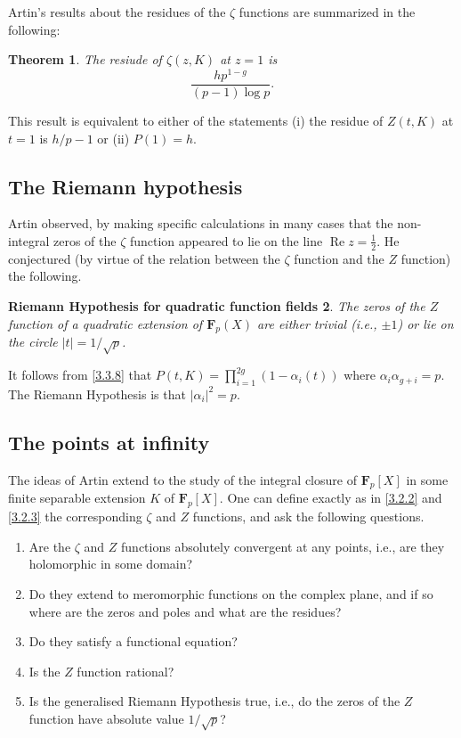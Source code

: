 \documentclass[10pt,leqno]{article}
\newtheorem{theo}{Theorem}[subsection]
\newtheorem{rhqff}[theo]{Riemann Hypothesis for quadratic function fields}
\theoremstyle{definition}
\def\FF{\mathbf{F}}
\DeclareMathOperator{\re}{Re}
\begin{document}
Artin's results about the residues of the $\zeta$ functions are summarized in the following:

\begin{theo}
\label{3.3.9}
The resiude of $\zeta(z,K)$ at $z = 1$ is
\[
\frac{hp^{1-g}}{(p-1)\log p}.
\]
\end{theo}


This result is equivalent to either of the statements (i) the residue of $Z(t,K)$ at $t=1$ is $h/p-1$ or (ii) $P(1) = h$.


\subsection{The Riemann hypothesis}
\label{ch:3.4}

Artin observed, by making specific calculations in many cases that the non-integral zeros of the $\zeta$ function appeared to lie on the line $\re z = \frac12$.
He conjectured (by virtue of the relation between the $\zeta$ function and the $Z$ function) the following.


\begin{rhqff}
\label{3.4.1}
The zeros of the $Z$ function of a quadratic extension of $\FF_p(X)$ are either trivial (i.e., $\pm1$) or lie on the circle $|t| = 1/\sqrt p$.
\end{rhqff}

It follows from \eqref{3.3.8} that $P(t,K) = \prod_{i=1}^{2g} (1-\alpha_i(t))$ where $\alpha_i \alpha_{g+i} = p$.
The Riemann Hypothesis is that $|\alpha_i|^2 = p$.


\subsection{The points at infinity}
\label{ch:3.5}

The ideas of Artin extend to the study of the integral closure of $\FF_p[X]$ in some finite separable extension $K$ of $\FF_p[X]$.
One can define exactly as in \eqref{3.2.2} and \eqref{3.2.3} the corresponding $\zeta$ and $Z$ functions, and ask the following questions.

\begin{enumerate}
\item
\label{3.5.1}
Are the $\zeta$ and $Z$ functions absolutely convergent at any points, i.e., are they holomorphic in some domain?

\item
\label{3.5.2}
Do they extend to meromorphic functions on the complex plane, and if so where are the zeros and poles and what are the residues?

\item
\label{3.5.3}
Do they satisfy a functional equation?

\item
\label{3.5.4}
Is the $Z$ function rational?

\item
\label{3.5.5}
Is the generalised Riemann Hypothesis true, i.e., do the zeros of the $Z$ function have absolute value $1/\sqrt p$?
\end{enumerate}
\end{document}
